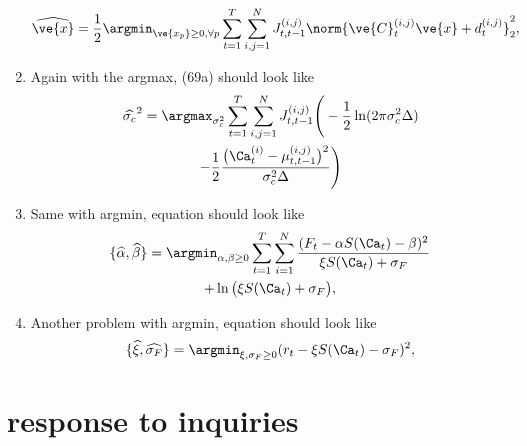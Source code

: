 \begin{enumerate}
\begin{equation*}
\begin{split}
\widehat{\ve{x}} &= \frac{1}{2}  \argmin_{\ve{x_p} \geq 0, \forall p} \sum_{t=1}^T \sum_{i,j=1}^N J^{(i,j)}_{t,t-1}  \norm{\ve{C}^{(i,j)}_t \ve{x} + d^{(i,j)}_t}_2^2,
\end{split}
\end{equation*}
\item Again with the argmax, (69a) should look like
\begin{multline*}
\widehat{\sigma_c}^2 = \argmax_{\sigma_c^2} \sum_{t=1}^T \sum_{i,j=1}^N J^{(i,j)}_{t,t-1}  \Bigg( -\frac{1}{2} \ln (2 \pi \sigma_c^2 \Delta) \\- \frac{1}{2} \frac{\big(\Ca_t^{(i)} - \mu_{t,t-1}^{(i,j)}\big)^2}{\sigma_c^2 \Delta}\Bigg)
\end{multline*}
\item Same with argmin, equation should look like
\begin{multline*} 
\{\widehat{\alpha}, \widehat{\beta}\} = \argmin_{\alpha, \beta \geq 0} \sum_{t=1}^T \sum_{i=1}^N  \frac{(F_t-\alpha S(\Ca_t) - \beta)^2}{\xi S(\Ca_t) + \sigma_F} \\ + \ln\big(\xi S(\Ca_t) + \sigma_F\big),
\end{multline*}
\item Another problem with argmin, equation should look like
\begin{align*}
\{\widehat{\xi},\widehat{\sigma_F}\} = \argmin_{\xi, \sigma_F \geq 0} (r_t-\xi S(\Ca_t) - \sigma_F)^2,
\end{align*}
\end{enumerate}


\newpage \clearpage
\section{response to inquiries}

